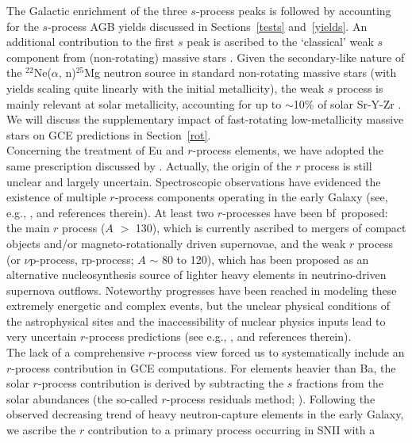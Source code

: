 \documentclass[manuscript]{aastex}
\begin{document}
The Galactic enrichment of the three $s$-process peaks is followed by 
accounting for the $s$-process AGB yields discussed in Sections~\ref{tests}
and~\ref{yields}.
An additional contribution to the first $s$ peak is ascribed to the 
`classical' weak $s$ component from (non-rotating) massive stars 
\citep{raiteri92,pignatari10}. Given the secondary-like nature of the 
$^{22}$Ne($\alpha$, n)$^{25}$Mg neutron source in standard non-rotating 
massive stars (with yields scaling quite linearly with the initial metallicity), 
the weak $s$ process is mainly relevant at solar metallicity, accounting
for up to $\sim$10\% of solar Sr-Y-Zr \citep{travaglio04}. 
We will discuss the supplementary impact of fast-rotating low-metallicity massive
stars on GCE predictions in Section~\ref{rot}. 
\\
Concerning the treatment of Eu and $r$-process elements, we have adopted
the same prescription discussed by \citet{travaglio99}. 
Actually, the origin of the $r$ process is still unclear and largely uncertain.
Spectroscopic observations have evidenced the existence of multiple $r$-process 
components operating in the early Galaxy (see, e.g., 
\citealt{siq15,roederer14,hansen14,hansen14a,hansen12,peterson13,montes07}, and references therein). 
At least two $r$-processes have been {bf\ proposed}:
the main $r$ process ($A$ $>$ 130), which is currently ascribed to mergers of 
compact objects and/or magneto-rotationally driven supernovae, 
and the weak $r$ process (or $\nu$p-process, rp-process; $A$ $\sim$ 80 to 120), 
which has been proposed as an alternative nucleosynthesis source of lighter heavy elements 
in neutrino-driven supernova outflows.
Noteworthy progresses have been reached in modeling these extremely energetic 
and complex events,
but the unclear physical conditions of the astrophysical sites 
and the inaccessibility of nuclear physics inputs lead to very uncertain
$r$-process predictions (see e.g., 
\citealt{pereiramontes16,eichler15,goriely15,nishimura15,kratz14,winteler12,arcones13,qianwass08}, 
and references therein).
\\
The lack of a comprehensive $r$-process view forced us to systematically include 
an $r$-process contribution in GCE computations. 
For elements heavier than Ba, the solar $r$-process contribution is derived
by subtracting the $s$ fractions from the solar abundances (the so-called $r$-process 
residuals method; \citealt{kaeppeler82,kaeppeler11}). 
Following the observed decreasing trend of heavy neutron-capture elements in the early 
Galaxy, we ascribe the $r$ contribution to a primary process occurring in SNII with a 
\end{document}

